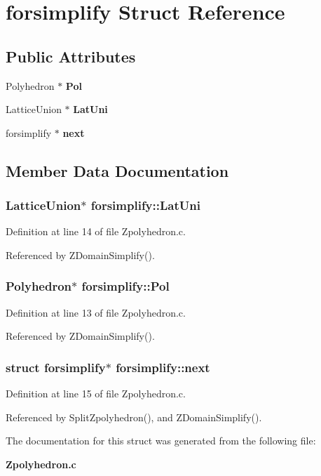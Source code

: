 \section{forsimplify  Struct Reference}
\label{structforsimplify}
\subsection*{Public Attributes}
\begin{CompactItemize}
\item 
Polyhedron $\ast$ {\bf Pol}
\item 
Lattice\-Union $\ast$ {\bf Lat\-Uni}
\item 
forsimplify $\ast$ {\bf next}
\end{CompactItemize}


\subsection{Member Data Documentation}
\subsubsection{\setlength{\rightskip}{0pt plus 5cm}Lattice\-Union$\ast$ forsimplify::Lat\-Uni}\label{structforsimplify_m1}




Definition at line 14 of file Zpolyhedron.c.

Referenced by ZDomain\-Simplify().

\subsubsection{\setlength{\rightskip}{0pt plus 5cm}Polyhedron$\ast$ forsimplify::Pol}\label{structforsimplify_m0}




Definition at line 13 of file Zpolyhedron.c.

Referenced by ZDomain\-Simplify().

\subsubsection{\setlength{\rightskip}{0pt plus 5cm}struct forsimplify$\ast$ forsimplify::next}\label{structforsimplify_m2}




Definition at line 15 of file Zpolyhedron.c.

Referenced by Split\-Zpolyhedron(), and ZDomain\-Simplify().



The documentation for this struct was generated from the following file:\begin{CompactItemize}
\item 
{\bf Zpolyhedron.c}\end{CompactItemize}

